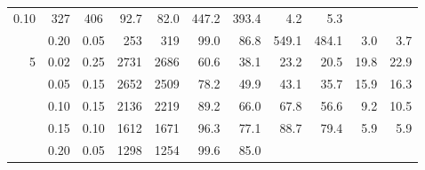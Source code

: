 \begin{table}[!htb]
\begin{tabular}{r r c r r r r r r r r}
    0.10                             & 327                                 & 406
                                     & 92.7                                & 82.0                             &
    447.2                            & 393.4                               & 4.2                              & 5.3         \\
                                     & 0.20                                &
    0.05                             & 253                                 & 319
                                     & 99.0                                & 86.8                             &
    549.1                            & 484.1                               & 3.0                              & 3.7         \\
    \midrule
    5                                & 0.02                                &
    0.25                             & 2731                                &
    2686                             & 60.6                                & 38.1
                                     & 23.2                                & 20.5                             & 19.8 & 22.9 \\
                                     & 0.05                                &
    0.15                             & 2652                                &
    2509                             & 78.2                                & 49.9
                                     & 43.1                                & 35.7                             & 15.9 & 16.3 \\
                                     & 0.10                                &
    0.15                             & 2136                                &
    2219                             & 89.2                                & 66.0
                                     & 67.8                                & 56.6                             & 9.2  & 10.5 \\
                                     & 0.15                                &
    0.10                             & 1612                                &
    1671                             & 96.3                                & 77.1
                                     & 88.7                                & 79.4                             & 5.9  & 5.9  \\
                                     & 0.20                                &
    0.05                             & 1298                                &
    1254                             & 99.6                                & 85.0

\end{tabular}
\end{table}
